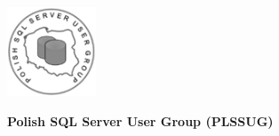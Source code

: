 \documentclass[\main/boa.tex]{subfiles}
\begin{document}
	
	\begin{minipage}[t]{0.915\textwidth}
		\center     
		\includegraphics[width=100px]{img/logos.bw/plssug.png} 
	\end{minipage}
	
	\Large \textbf {Polish SQL Server User Group (PLSSUG)}
	
	
	\vskip 0.3cm
	\normalsize 

\vskip 1.5cm	
\end{document}
